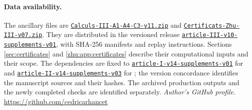 \documentclass[leqno]{article}
\numberwithin{equation}{section}
\begin{document}
\paragraph{Data availability.} The ancillary files are \href{https://github.com/cedricarhancet/haagerup-c8/releases/download/article-III-v10-supplements-v01/Calculs-III-A1-A4-C3-v11.zip}{\nolinkurl{Calculs-III-A1-A4-C3-v11.zip}} and \href{https://github.com/cedricarhancet/haagerup-c8/releases/download/article-III-v10-supplements-v01/Certificats-Zhu-III-v07.zip}{\nolinkurl{Certificats-Zhu-III-v07.zip}}. They are distributed in the versioned release \href{https://github.com/cedricarhancet/haagerup-c8/releases/tag/article-III-v10-supplements-v01}{\texttt{article-III-v10-supplements-v01}}, with SHA-256 manifests and replay instructions. Sections \ref{sec:certificates} and \ref{zhu:app:certificates} describe their computational inputs and their scope. The dependencies are fixed to \href{https://github.com/cedricarhancet/haagerup-c8/releases/tag/article-I-v14-supplements-v01}{\texttt{article-I-v14-supplements-v01}} for \cite{Arh26} and \href{https://github.com/cedricarhancet/haagerup-c8/releases/tag/article-II-v14-supplements-v03}{\texttt{article-II-v14-supplements-v03}} for \cite{ArhII}; the version concordance identifies the manuscript sources and their hashes. The archived production outputs and the newly completed checks are identified separately.
\noindent\textit{Author's GitHub profile.} \url{https://github.com/cedricarhancet}
\end{document}
